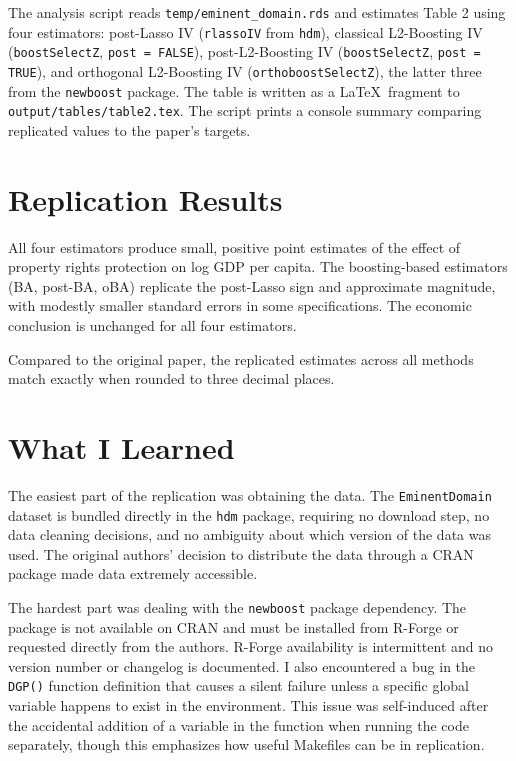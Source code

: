 \documentclass[12pt]{article}
\begin{document}
The analysis script reads \texttt{temp/eminent\_domain.rds} and estimates
Table 2 using four estimators: post-Lasso IV (\texttt{rlassoIV} from
\texttt{hdm}), classical L2-Boosting IV (\texttt{boostSelectZ},
\texttt{post = FALSE}), post-L2-Boosting IV (\texttt{boostSelectZ},
\texttt{post = TRUE}), and orthogonal L2-Boosting IV
(\texttt{orthoboostSelectZ}), the latter three from the \texttt{newboost}
package. The table is written as a \LaTeX\ fragment to
\texttt{output/tables/table2.tex}. The script prints a console
summary comparing replicated values to the paper's targets.

\section{Replication Results}



All four estimators produce small, positive point estimates of the effect of
property rights protection on log GDP per capita. The
boosting-based estimators (BA, post-BA, oBA) replicate the post-Lasso sign
and approximate magnitude, with modestly smaller standard errors in some specifications. The economic
conclusion is unchanged for all four estimators.

Compared to the original paper, the replicated estimates across all methods match exactly when rounded to
three decimal places. 

\section{What I Learned}

The easiest part of the replication was obtaining the data. The
\texttt{EminentDomain} dataset is bundled directly in the \texttt{hdm}
package, requiring no download step, no data cleaning decisions, and no
ambiguity about which version of the data was used. The original authors'
decision to distribute the data through a CRAN package made data extremely accessible.

The hardest part was dealing with the \texttt{newboost} package dependency. The package
is not available on CRAN and must be installed from R-Forge or requested
directly from the authors. R-Forge availability is intermittent and no version
number or changelog is documented. I also encountered a bug in the
\texttt{DGP()} function definition that causes a silent failure unless a
specific global variable happens to exist in the environment. This issue was self-induced after the accidental addition of a variable in the function when running the code separately, though this emphasizes how useful Makefiles can be in replication.
\end{document}

